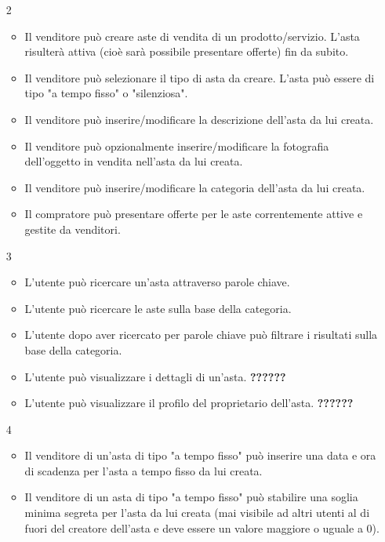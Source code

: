 \begin{itemize}
            \item[2] 
                \begin{itemize}
                    \item Il venditore può creare aste di vendita di un prodotto/servizio. L'asta risulterà attiva (cioè sarà possibile presentare offerte) fin da subito.
                    \item Il venditore può selezionare il tipo di asta da creare. L'asta può essere di tipo "a tempo fisso" o "silenziosa".
                    \item Il venditore può inserire/modificare la descrizione dell'asta da lui creata.
                    \item Il venditore può opzionalmente inserire/modificare la fotografia dell'oggetto in vendita nell'asta da lui creata.
                    \item Il venditore può inserire/modificare la categoria dell'asta da lui creata.
                    \item Il compratore può presentare offerte per le aste correntemente attive e gestite da venditori.
                \end{itemize}
            \item[3]
                \begin{itemize}
                    \item L'utente può ricercare un'asta attraverso parole chiave.
                    \item L'utente può ricercare le aste sulla base della categoria.
                    \item L’utente dopo aver ricercato per parole chiave può filtrare i risultati sulla base della categoria.
                    \item L'utente può visualizzare i dettagli di un'asta. \textbf{??????}
                    \item L'utente può visualizzare il profilo del proprietario dell'asta. \textbf{??????}
                \end{itemize}
            \item[4]
                \begin{itemize}
                    \item Il venditore di un'asta di tipo "a tempo fisso" può inserire una data e ora di scadenza per l'asta a tempo fisso da lui creata.
                    \item Il venditore di un asta di tipo "a tempo fisso" può stabilire una soglia minima segreta per l'asta da lui creata (mai visibile ad altri utenti al di fuori del creatore dell'asta e deve essere un valore maggiore o uguale a 0).

\end{itemize}
\end{itemize}
